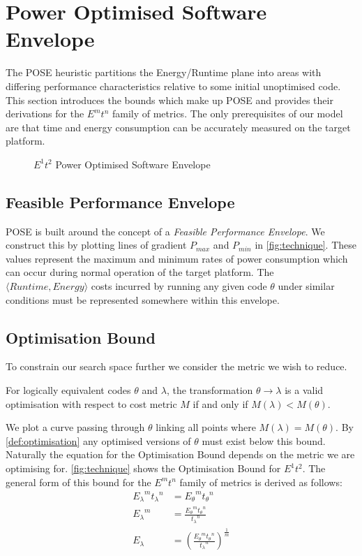 \section{Power Optimised Software Envelope}
\label{sec:pose}

The POSE heuristic partitions the Energy/Runtime plane into areas with differing performance characteristics relative to some initial unoptimised code.
This section introduces the bounds which make up POSE and provides their derivations for the $E^mt^n$ family of metrics.
The only prerequisites of our model are that time and energy consumption can be accurately measured on the target platform.

\begin{figure}
\centering

\caption{$E^1t^2$ Power Optimised Software Envelope}
\label{fig:technique}
\end{figure}

\subsection{Feasible Performance Envelope}
POSE is built around the concept of a \emph{Feasible Performance Envelope}.
We construct this by plotting lines of gradient $P_{max}$ and $P_{min}$ in \autoref{fig:technique}.
These values represent the maximum and minimum rates of power consumption which can occur during normal operation of the target platform.
The $\langle Runtime, Energy\rangle$ costs incurred by running any given code $\theta$ under similar conditions must be represented somewhere within this envelope.

\subsection{Optimisation Bound}
To constrain our search space further we consider the metric we wish to reduce.

\begin{definition}
For logically equivalent codes $\theta$ and $\lambda$, the transformation ${\theta \to \lambda}$ is a valid optimisation with respect to cost metric $M$ if and only if ${M(\lambda) < M(\theta)}$.
\label{def:optimisation}
\end{definition}

We plot a curve passing through $\theta$ linking all points where ${M(\lambda) = M(\theta)}$. By \autoref{def:optimisation} any optimised versions of $\theta$ must exist below this bound.
Naturally the equation for the Optimisation Bound depends on the metric we are optimising for.
\autoref{fig:technique} shows the Optimisation Bound for $E^1t^2$.
The general form of this bound for the $E^mt^n$ family of metrics is derived as follows:
\begin{align}
 {E_\lambda}^m{t_\lambda}^n &= {E_\theta}^m{t_\theta}^n \nonumber \\
 {E_\lambda}^m &= \frac{{E_\theta}^m{t_\theta}^n}{{t_\lambda}^n} \nonumber \\
  E_\lambda &= (\frac{{E_\theta}^m{t_\theta}^n}{{t_\lambda}^n})^\frac{1}{m}
\label{eq:optimisation}
\end{align}

